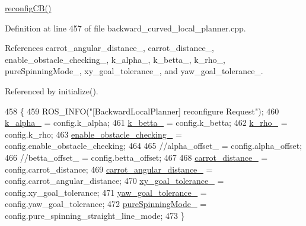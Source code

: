 \hyperlink{classcl__move__base__z_1_1backward__local__planner_1_1BackwardLocalPlanner_a62e4783adae03ce92190d855a021b91d}{reconfig\+C\+B()} 

Definition at line 457 of file backward\+\_\+curved\+\_\+local\+\_\+planner.\+cpp.



References carrot\+\_\+angular\+\_\+distance\+\_\+, carrot\+\_\+distance\+\_\+, enable\+\_\+obstacle\+\_\+checking\+\_\+, k\+\_\+alpha\+\_\+, k\+\_\+betta\+\_\+, k\+\_\+rho\+\_\+, pure\+Spinning\+Mode\+\_\+, xy\+\_\+goal\+\_\+tolerance\+\_\+, and yaw\+\_\+goal\+\_\+tolerance\+\_\+.



Referenced by initialize().


\begin{DoxyCode}
458         \{
459             ROS\_INFO(\textcolor{stringliteral}{"[BackwardLocalPlanner] reconfigure Request"});
460             \hyperlink{classcl__move__base__z_1_1backward__local__planner_1_1BackwardLocalPlanner_abf7a5a56de2ee41afba7e63c0628ec35}{k\_alpha\_} = config.k\_alpha;
461             \hyperlink{classcl__move__base__z_1_1backward__local__planner_1_1BackwardLocalPlanner_a9f257183d87f1d732cb7e404f09905ad}{k\_betta\_} = config.k\_betta;
462             \hyperlink{classcl__move__base__z_1_1backward__local__planner_1_1BackwardLocalPlanner_ad8a36184bfb011545c751109e23d3b98}{k\_rho\_} = config.k\_rho;
463             \hyperlink{classcl__move__base__z_1_1backward__local__planner_1_1BackwardLocalPlanner_a154043366660cc02ec758dda32817511}{enable\_obstacle\_checking\_} = config.enable\_obstacle\_checking;
464 
465             \textcolor{comment}{//alpha\_offset\_ = config.alpha\_offset;}
466             \textcolor{comment}{//betta\_offset\_ = config.betta\_offset;}
467 
468             \hyperlink{classcl__move__base__z_1_1backward__local__planner_1_1BackwardLocalPlanner_a0bbb80ce5bae865c4322869422803296}{carrot\_distance\_} = config.carrot\_distance;
469             \hyperlink{classcl__move__base__z_1_1backward__local__planner_1_1BackwardLocalPlanner_a63e30befa09c4a67cf55086923b760c7}{carrot\_angular\_distance\_} = config.carrot\_angular\_distance;
470             \hyperlink{classcl__move__base__z_1_1backward__local__planner_1_1BackwardLocalPlanner_aa4ec2c87947a3c08f8278eff052e7c8c}{xy\_goal\_tolerance\_} = config.xy\_goal\_tolerance;
471             \hyperlink{classcl__move__base__z_1_1backward__local__planner_1_1BackwardLocalPlanner_a9c5104d328041fcde5a3c02664abad48}{yaw\_goal\_tolerance\_} = config.yaw\_goal\_tolerance;
472             \hyperlink{classcl__move__base__z_1_1backward__local__planner_1_1BackwardLocalPlanner_aebc89ccfa79fdf6bd45ba35134bec3fb}{pureSpinningMode\_} = config.pure\_spinning\_straight\_line\_mode;
473         \}
\end{DoxyCode}
